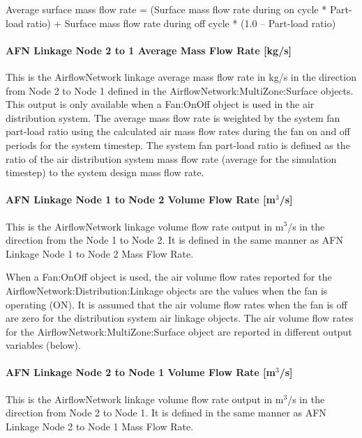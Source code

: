 Average surface mass flow rate = (Surface mass flow rate during on cycle * Part-load ratio) + Surface mass flow rate during off cycle * (1.0 -- Part-load ratio)

\paragraph{AFN Linkage Node 2 to 1 Average Mass Flow Rate {[}kg/s{]}}\label{afn-linkage-node-2-to-1-average-mass-flow-rate-kgs}

This is the AirflowNetwork linkage average mass flow rate in kg/s in the direction from Node 2 to Node 1 defined in the AirflowNetwork:MultiZone:Surface objects. This output is only available when a Fan:OnOff object is used in the air distribution system. The average mass flow rate is weighted by the system fan part-load ratio using the calculated air mass flow rates during the fan on and off periods for the system timestep. The system fan part-load ratio is defined as the ratio of the air distribution system mass flow rate (average for the simulation timestep) to the system design mass flow rate.

\paragraph{AFN Linkage Node 1 to Node 2 Volume Flow Rate {[}m\(^{3}\)/s{]}}\label{afn-linkage-node-1-to-node-2-volume-flow-rate-m3s}

This is the AirflowNetwork linkage volume flow rate output in m\(^{3}\)/s in the direction from the Node 1 to Node 2. It is defined in the same manner as AFN Linkage Node 1 to Node 2 Mass Flow Rate.

When a Fan:OnOff object is used, the air volume flow rates reported for the AirflowNetwork:Distribution:Linkage objects are the values when the fan is operating (ON). It is assumed that the air volume flow rates when the fan is off are zero for the distribution system air linkage objects. The air volume flow rates for the AirflowNetwork:MultiZone:Surface object are reported in different output variables (below).

\paragraph{AFN Linkage Node 2 to Node 1 Volume Flow Rate {[}m\(^{3}\)/s{]}}\label{afn-linkage-node-2-to-node-1-volume-flow-rate-m3s}

This is the AirflowNetwork linkage volume flow rate output in m\(^{3}\)/s in the direction from Node 2 to Node 1. It is defined in the same manner as AFN Linkage Node 2 to Node 1 Mass Flow Rate.

